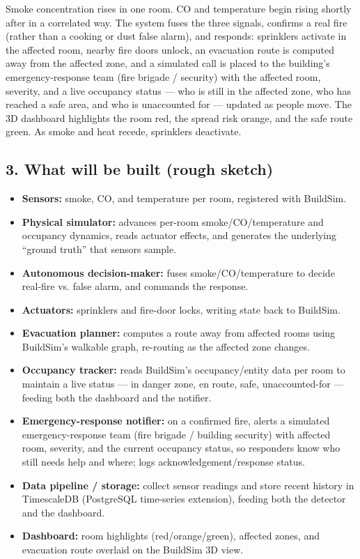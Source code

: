 \documentclass[
  10pt,
]{article}
\providecommand{\tightlist}{%
  \setlength{\itemsep}{0pt}\setlength{\parskip}{0pt}}
\begin{document}
Smoke concentration rises in one room. CO and temperature begin rising
shortly after in a correlated way. The system fuses the three signals,
confirms a real fire (rather than a cooking or dust false alarm), and
responds: sprinklers activate in the affected room, nearby fire doors
unlock, an evacuation route is computed away from the affected zone, and
a simulated call is placed to the building's emergency-response team
(fire brigade / security) with the affected room, severity, and a live
occupancy status --- who is still in the affected zone, who has reached
a safe area, and who is unaccounted for --- updated as people move. The
3D dashboard highlights the room red, the spread risk orange, and the
safe route green. As smoke and heat recede, sprinklers deactivate.

\subsection{3. What will be built (rough
sketch)}\label{what-will-be-built-rough-sketch}

\begin{itemize}
\tightlist
\item
  \textbf{Sensors:} smoke, CO, and temperature per room, registered with
  BuildSim.
\item
  \textbf{Physical simulator:} advances per-room smoke/CO/temperature
  and occupancy dynamics, reads actuator effects, and generates the
  underlying ``ground truth'' that sensors sample.
\item
  \textbf{Autonomous decision-maker:} fuses smoke/CO/temperature to
  decide real-fire vs. false alarm, and commands the response.
\item
  \textbf{Actuators:} sprinklers and fire-door locks, writing state back
  to BuildSim.
\item
  \textbf{Evacuation planner:} computes a route away from affected rooms
  using BuildSim's walkable graph, re-routing as the affected zone
  changes.
\item
  \textbf{Occupancy tracker:} reads BuildSim's occupancy/entity data per
  room to maintain a live status --- in danger zone, en route, safe,
  unaccounted-for --- feeding both the dashboard and the notifier.
\item
  \textbf{Emergency-response notifier:} on a confirmed fire, alerts a
  simulated emergency-response team (fire brigade / building security)
  with affected room, severity, and the current occupancy status, so
  responders know who still needs help and where; logs
  acknowledgement/response status.
\item
  \textbf{Data pipeline / storage:} collect sensor readings and store
  recent history in TimescaleDB (PostgreSQL time-series extension),
  feeding both the detector and the dashboard.
\item
  \textbf{Dashboard:} room highlights (red/orange/green), affected
  zones, and evacuation route overlaid on the BuildSim 3D view.
\end{itemize}
\end{document}
